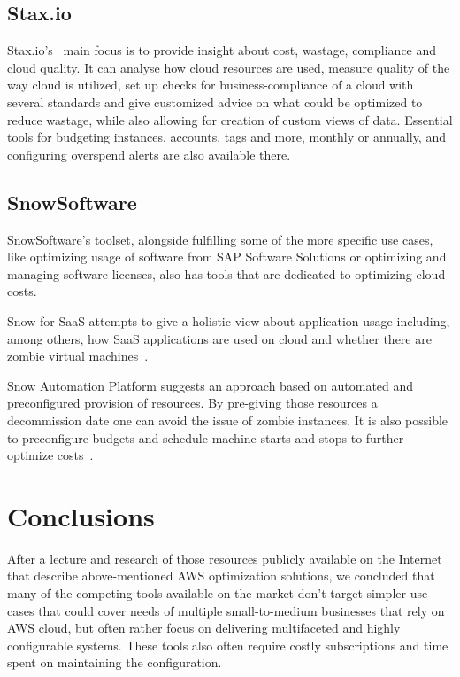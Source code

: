 \documentclass[licencjacka,en]{thesisclass}
\begin{document}
    \subsection{Stax.io}

    Stax.io's~\cite{Stax.io} main focus is to provide insight about cost,
    wastage, compliance and cloud quality.
    It can analyse how cloud resources are used, measure quality of the way cloud is utilized,
    set up checks for business-compliance of a cloud with several standards
    and give customized advice on what could be optimized to reduce wastage,
    while also allowing for creation of custom views of data.
    Essential tools for budgeting instances, accounts, tags and more, monthly or annually,
    and configuring overspend alerts are also available there.

    \subsection{SnowSoftware}

    SnowSoftware's toolset, alongside fulfilling some of the more specific use cases,
    like optimizing usage of software from SAP Software Solutions or optimizing
    and managing software licenses,
    also has tools that are dedicated to optimizing cloud costs.

    Snow for SaaS attempts to give a holistic view about application usage
    including, among others, how SaaS applications are used
    on cloud and whether there are zombie virtual machines~\cite{SnowSaaS}.

    Snow Automation Platform suggests an approach based on automated
    and preconfigured provision of resources.
    By pre-giving those resources a decommission date one can avoid the issue of zombie instances.
    It is also possible to preconfigure budgets and schedule machine starts
    and stops to further optimize costs~\cite{SnowBlog}.

    \section{Conclusions}

    After a lecture and research of those resources publicly available on the Internet
    that describe above-mentioned AWS optimization solutions,
    we concluded that many of the competing tools
    available on the market don't target simpler use cases that could
    cover needs of multiple small-to-medium businesses that rely on AWS cloud,
    but often rather focus on delivering multifaceted and highly configurable systems.
    These tools also often require costly subscriptions and time spent on maintaining
    the configuration.
\end{document}
